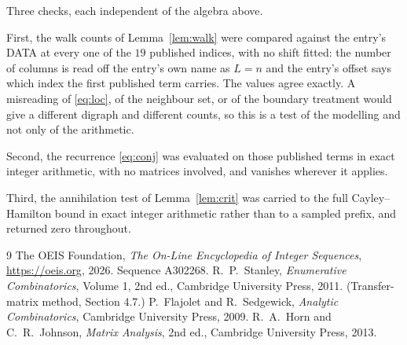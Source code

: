 \documentclass[11pt,a4paper]{article}
\theoremstyle{plain}
\theoremstyle{definition}
\begin{document}
Three checks, each independent of the algebra above.

First, the walk counts of Lemma~\ref{lem:walk} were compared against the entry's DATA at
every one of the $19$ published indices, with no shift fitted: the number of columns is
read off the entry's own name as $L=n$ and the entry's offset says which index the first
published term carries. The values agree exactly. A misreading of \eqref{eq:loc}, of the
neighbour set, or of the boundary treatment would give a different digraph and different
counts, so this is a test of the modelling and not only of the arithmetic.

Second, the recurrence \eqref{eq:conj} was evaluated on those published terms in exact
integer arithmetic, with no matrices involved, and vanishes wherever it applies.

Third, the annihilation test of Lemma~\ref{lem:crit} was carried to the full
Cayley--Hamilton bound in exact integer arithmetic rather than to a sampled prefix, and
returned zero throughout.

\begin{thebibliography}{9}
 The OEIS Foundation, \emph{The On-Line Encyclopedia of Integer
Sequences}, \url{https://oeis.org}, 2026. Sequence A302268.
 R.~P.~Stanley, \emph{Enumerative Combinatorics}, Volume 1, 2nd ed.,
Cambridge University Press, 2011. (Transfer-matrix method, Section 4.7.)
 P.~Flajolet and R.~Sedgewick, \emph{Analytic Combinatorics}, Cambridge
University Press, 2009.
 R.~A.~Horn and C.~R.~Johnson, \emph{Matrix Analysis}, 2nd ed., Cambridge
University Press, 2013.
\end{thebibliography}
\end{document}
